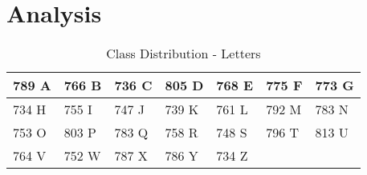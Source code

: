 \section*{Analysis}
\begin{table}[ht!]
    \centering
    \begin{tabular}{|l|l|l|l|l|l|l|}
         \hline
            789 A  &  766 B  &   736 C  &   805 D  &  768 E   &  775 F  &   773 G \\ \hline
            734 H  &  755 I  &   747 J  &   739 K  &  761 L   &  792 M  &   783 N \\ \hline
            753 O  &  803 P  &   783 Q  &   758 R  &  748 S   &  796 T  &   813 U \\ \hline
            764 V  &  752 W  &   787 X  &   786 Y  &  734 Z   &         &         \\ \hline
    \end{tabular}
    \caption{Class Distribution - Letters}
\end{table}
